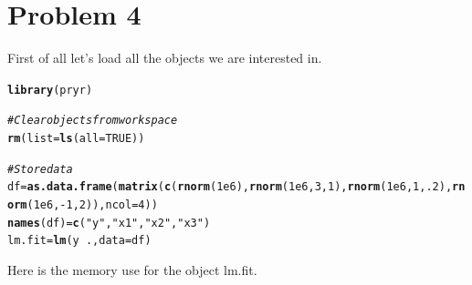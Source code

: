 \documentclass{llncs}\usepackage[]{graphicx}\usepackage[]{color}
\makeatletter
\newcommand{\hlnum}[1]{\textcolor[rgb]{0.686,0.059,0.569}{#1}}%
\newcommand{\hlstr}[1]{\textcolor[rgb]{0.192,0.494,0.8}{#1}}%
\newcommand{\hlcom}[1]{\textcolor[rgb]{0.678,0.584,0.686}{\textit{#1}}}%
\newcommand{\hlopt}[1]{\textcolor[rgb]{0,0,0}{#1}}%
\newcommand{\hlstd}[1]{\textcolor[rgb]{0.345,0.345,0.345}{#1}}%
\newcommand{\hlkwb}[1]{\textcolor[rgb]{0.69,0.353,0.396}{#1}}%
\newcommand{\hlkwc}[1]{\textcolor[rgb]{0.333,0.667,0.333}{#1}}%
\newcommand{\hlkwd}[1]{\textcolor[rgb]{0.737,0.353,0.396}{\textbf{#1}}}%
\newenvironment{kframe}{%
 \def\at@end@of@kframe{}%
 \ifinner\ifhmode%
  \def\at@end@of@kframe{\end{minipage}}%
  \begin{minipage}{\columnwidth}%
 \fi\fi%
 \def\FrameCommand##1{\hskip\@totalleftmargin \hskip-\fboxsep
 \colorbox{shadecolor}{##1}\hskip-\fboxsep
     \hskip-\linewidth \hskip-\@totalleftmargin \hskip\columnwidth}%
 \MakeFramed {\advance\hsize-\width
   \@totalleftmargin\z@ \linewidth\hsize
   \@setminipage}}%
 {\par\unskip\endMakeFramed%
 \at@end@of@kframe}
\newenvironment{knitrout}{}{} %
\makeatother
\begin{document}
\section{Problem 4}
\noindent
First of all let's load all the objects we are interested in.
\begin{knitrout}
\color{fgcolor}\begin{kframe}
\begin{alltt}
\hlkwd{library}\hlstd{(pryr)}

\hlcom{# Clear objects from workspace}
\hlkwd{rm}\hlstd{(}\hlkwc{list}\hlstd{=}\hlkwd{ls}\hlstd{(}\hlkwc{all}\hlstd{=}\hlnum{TRUE}\hlstd{))}

\hlcom{# Store data}
\hlstd{df}\hlkwb{=}\hlkwd{as.data.frame}\hlstd{(}\hlkwd{matrix}\hlstd{(}\hlkwd{c}\hlstd{(}\hlkwd{rnorm}\hlstd{(}\hlnum{1e6}\hlstd{),}\hlkwd{rnorm}\hlstd{(}\hlnum{1e6}\hlstd{,}\hlnum{3}\hlstd{,}\hlnum{1}\hlstd{),}\hlkwd{rnorm}\hlstd{(}\hlnum{1e6}\hlstd{,}\hlnum{1}\hlstd{,}\hlnum{.2}\hlstd{),}\hlkwd{rnorm}\hlstd{(}\hlnum{1e6}\hlstd{,}\hlopt{-}\hlnum{1}\hlstd{,}\hlnum{2}\hlstd{)),}\hlkwc{ncol}\hlstd{=}\hlnum{4}\hlstd{))}
\hlkwd{names}\hlstd{(df)}\hlkwb{=}\hlkwd{c}\hlstd{(}\hlstr{"y"}\hlstd{,}\hlstr{"x1"}\hlstd{,}\hlstr{"x2"}\hlstd{,}\hlstr{"x3"}\hlstd{)}
\hlstd{lm.fit}\hlkwb{=}\hlkwd{lm}\hlstd{(y}\hlopt{~}\hlstd{.,}\hlkwc{data} \hlstd{= df)}
\end{alltt}
\end{kframe}
\end{knitrout}
\noindent
Here is the memory use for the object lm.fit.
\end{document}
